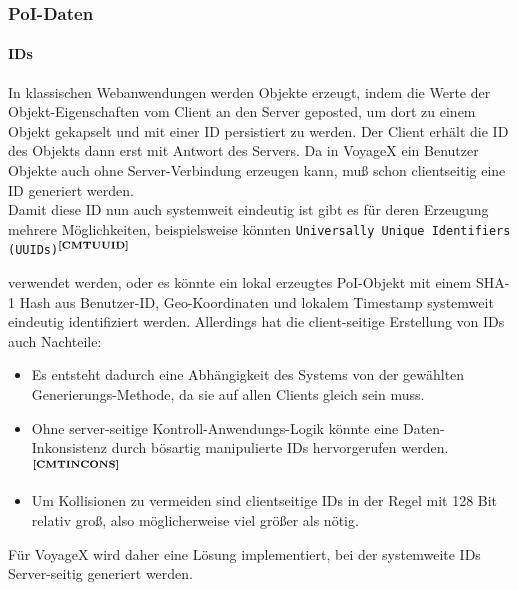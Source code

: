 \subsubsection{PoI-Daten}
\paragraph{IDs}
In klassischen Webanwendungen werden Objekte erzeugt, indem die Werte der Objekt-Eigenschaften vom Client an den Server geposted, um dort zu einem Objekt gekapselt und mit einer ID persistiert zu werden. Der Client erhält die ID des Objekts dann erst mit Antwort des Servers. Da in VoyageX ein Benutzer Objekte auch ohne Server-Verbindung erzeugen kann, muß schon clientseitig eine ID generiert werden.\\
Damit diese ID nun auch systemweit eindeutig
ist gibt es für deren Erzeugung mehrere Möglichkeiten, beispielsweise könnten \texttt{Universally Unique Identifiers (UUIDs)}$^{\textbf{\ref{CMTUUID}}}$
\addtocounter{footnote}{1}%
 verwendet werden, oder es könnte ein lokal erzeugtes PoI-Objekt mit einem SHA-1 Hash aus Benutzer-ID, Geo-Koordinaten und lokalem Timestamp systemweit eindeutig identifiziert werden. Allerdings hat die client-seitige Erstellung von IDs auch Nachteile:
\begin{itemize}[leftmargin=*,noitemsep,topsep=1ex,parsep=0pt,partopsep=0pt]
\item Es entsteht dadurch eine Abhängigkeit des Systems von der gewählten Generierungs-Methode, da sie auf allen Clients gleich sein muss.
\item Ohne server-seitige Kontroll-Anwendungs-Logik könnte eine Daten-Inkonsistenz durch bösartig manipulierte IDs hervorgerufen werden.$^{\textbf{\ref{CMTINCONS}}}$
\addtocounter{footnote}{1}%
\item Um Kollisionen zu vermeiden sind clientseitige IDs in der Regel mit 128 Bit relativ groß, also möglicherweise viel größer als nötig.
\end{itemize}
Für VoyageX wird daher eine Lösung implementiert, bei der systemweite IDs Server-seitig generiert werden.

